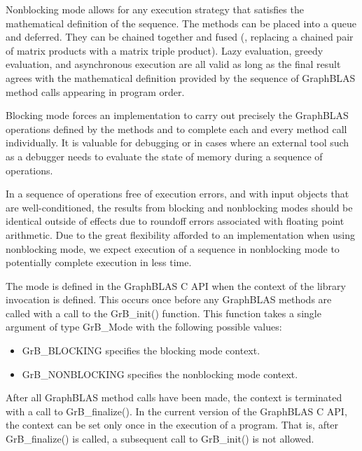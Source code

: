 Nonblocking mode allows for any execution strategy that satisfies the
mathematical definition of the sequence.  The methods can be placed
into a queue and deferred.  They can be chained together and fused
(\eg, replacing a chained pair of matrix products with a matrix triple
product).  Lazy evaluation, greedy evaluation, and asynchronous execution
are all valid as long as the final result agrees with the mathematical
definition provided by the sequence of GraphBLAS method calls appearing
in  program order.

Blocking mode forces an implementation to carry out precisely the
GraphBLAS operations defined by the methods and to complete each and
every method call individually.  It is valuable for debugging or in
cases where an external tool such as a debugger needs to evaluate the
state of memory during a sequence of operations.

In a sequence of operations free of execution errors, and with input
objects that are well-conditioned, the results from blocking and
nonblocking modes should be identical outside of effects due to roundoff
errors associated with floating point arithmetic.  Due to the great
flexibility afforded to an implementation when using nonblocking mode,
we expect execution of a sequence in nonblocking mode to potentially
complete execution in less time.

The mode is defined in the GraphBLAS C API when the context of the
library invocation is defined.  This occurs once before any GraphBLAS
methods are called with a call to the {\sf GrB\_init()} function.
This function takes a single argument of type {\sf GrB\_Mode} with the
following possible values:

\begin{itemize}

\item {\sf GrB\_BLOCKING} specifies the blocking mode context.

\item {\sf GrB\_NONBLOCKING} specifies the nonblocking mode context.

\end{itemize}

After all GraphBLAS method calls have been made, the context is terminated
with a call to {\sf GrB\_finalize()}.  In the current version of the
GraphBLAS C API, the context can be set only once in the execution of
a program. That is, after {\sf GrB\_finalize()} is called, a subsequent
call to {\sf GrB\_init()} is not allowed.

